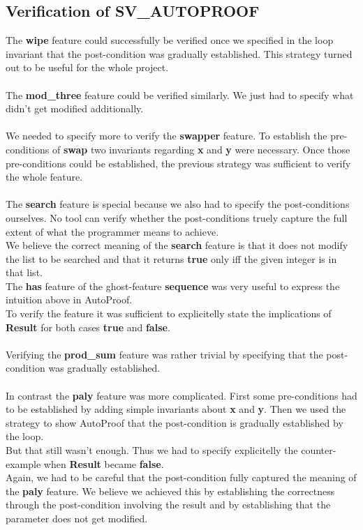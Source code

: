 \documentclass{report}
\begin{document}
\subsection{Verification of SV\_AUTOPROOF}

The \textbf{wipe} feature could successfully be verified once we specified in the loop
invariant that the post-condition was gradually established. This strategy
turned out to be useful for the whole project.
\\
\\
The \textbf{mod\_three} feature could be verified similarly. We just had to
specify what didn't get modified additionally.
\\
\\
We needed to specify more to verify the \textbf{swapper} feature. To establish
the pre-conditions of \textbf{swap} two invariants regarding \textbf{x} and
\textbf{y} were necessary. Once those pre-conditions could be established, the
previous strategy was sufficient to verify the whole feature.
\\
\\
The \textbf{search} feature is special because we also had to specify the 
post-conditions ourselves. No tool can verify whether the post-conditions truely
capture the full extent of what the programmer means to achieve.\\
We believe the correct meaning of the \textbf{search} feature is that it does
not modify the list to be searched and that it returns \textbf{true} only iff
the given integer is in that list.\\
The \textbf{has} feature of the ghost-feature \textbf{sequence} was very useful
to express the intuition above in AutoProof.\\
To verify the feature it was sufficient to explicitelly state the implications
of \textbf{Result} for both cases \textbf{true} and \textbf{false}.
\\
\\
Verifying the \textbf{prod\_sum} feature was rather trivial by specifying that
the post-condition was gradually established.
\\
\\
In contrast the \textbf{paly} feature was more complicated. First some pre-conditions
had to be established by adding simple invariants about \textbf{x} and \textbf{y}.
Then we used the strategy to show AutoProof that the post-condition is gradually
established by the loop.\\
But that still wasn't enough. Thus we had to specify explicitelly the counter-example
when \textbf{Result} became \textbf{false}.\\
Again, we had to be careful that the post-condition fully captured the meaning
of the \textbf{paly} feature. We believe we achieved this by establishing the
correctness through the post-condition involving the result and by establishing
that the parameter does not get modified.
\end{document}
